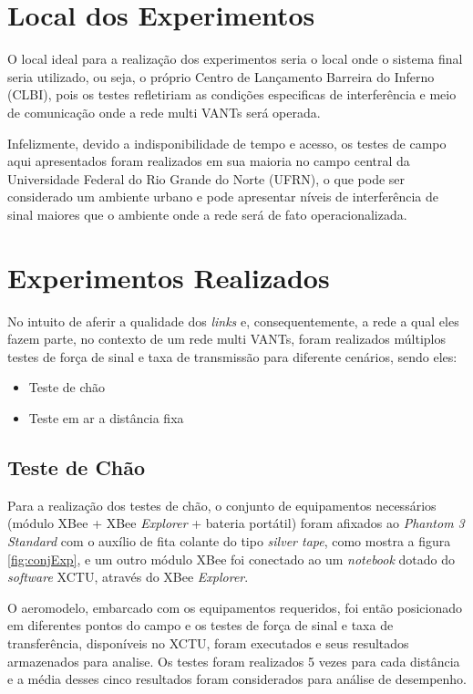 \section{Local dos Experimentos}

O local ideal para a realização dos experimentos seria o local onde o sistema final seria utilizado, ou seja, o próprio Centro de Lançamento Barreira do Inferno (CLBI), pois os testes refletiriam as condições especificas de interferência e meio de comunicação onde a rede multi VANTs será operada.

Infelizmente, devido a indisponibilidade de tempo e acesso, os testes de campo aqui apresentados foram realizados em sua maioria no campo central da Universidade Federal do Rio Grande do Norte (UFRN), o que pode ser considerado um ambiente urbano e pode apresentar níveis de interferência de sinal maiores que o ambiente onde a rede será de fato operacionalizada. 

\section{Experimentos Realizados}

No intuito de aferir a qualidade dos \emph{links} e, consequentemente, a rede a qual eles fazem parte, no contexto de um rede multi VANTs, foram realizados múltiplos testes de força de sinal e taxa de transmissão para diferente cenários, sendo eles:

\begin{itemize}
\item Teste de chão
\item Teste em ar a distância fixa
\end{itemize} 

\subsection{Teste de Chão}

Para a realização dos testes de chão, o conjunto de equipamentos necessários (módulo XBee + XBee \emph{Explorer} + bateria portátil) foram afixados ao \emph{Phantom 3 Standard} com o auxílio de fita colante do tipo \emph{silver tape}, como mostra a figura \ref{fig:conjExp}, e um outro módulo XBee foi conectado ao um \emph{notebook} dotado do \emph{software} XCTU, através do XBee \emph{Explorer}.

O aeromodelo, embarcado com os equipamentos requeridos, foi então posicionado em diferentes pontos do campo e os testes de força de sinal e taxa de transferência, disponíveis no XCTU, foram executados e seus resultados armazenados para analise. Os testes foram realizados 5 vezes para cada distância e a média desses cinco resultados foram considerados para análise de desempenho. 
 
